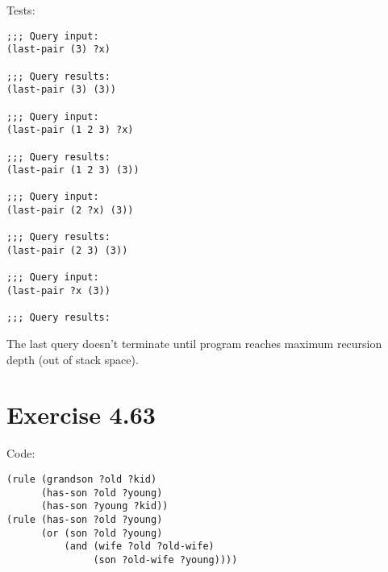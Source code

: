 \documentclass[../main.tex]{subfiles}
\begin{document}
Tests:
\begin{lstlisting}
;;; Query input:
(last-pair (3) ?x)

;;; Query results:
(last-pair (3) (3))

;;; Query input:
(last-pair (1 2 3) ?x)

;;; Query results:
(last-pair (1 2 3) (3))

;;; Query input:
(last-pair (2 ?x) (3))

;;; Query results:
(last-pair (2 3) (3))

;;; Query input:
(last-pair ?x (3))

;;; Query results:
\end{lstlisting}

The last query doesn't terminate until program reaches maximum recursion depth (out of stack space).

\section{Exercise 4.63}

Code:

\begin{lstlisting}
(rule (grandson ?old ?kid)
      (has-son ?old ?young)
      (has-son ?young ?kid))
(rule (has-son ?old ?young)
      (or (son ?old ?young)
          (and (wife ?old ?old-wife)
               (son ?old-wife ?young))))
\end{lstlisting}
\end{document}
